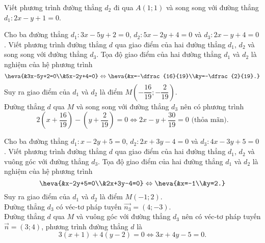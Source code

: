 	\begin{bt}%
		Viết phương trình đường thẳng $d_2$ đi qua $A\left(1;1\right)$ và song song với đường thẳng $d_1\colon 2x-y+1=0$.
	\end{bt}
	\begin{bt}%
		Cho ba đường thẳng $d_1\colon 3x-5y+2=0$, $d_2\colon 5x-2y+4=0$ và $d_3\colon 2x-y+4=0$. Viết phương trình đường thẳng $d$ qua giao điểm của hai đường thẳng $d_1$, $d_2$ và song song với đường thẳng $d_3$.
		\loigiai
		{Tọa độ giao điểm của hai đường thẳng $d_1$ và $d_2$ là nghiệm của hệ phương trình 
			$$\heva{&3x-5y+2=0\\&5x-2y+4=0} \Leftrightarrow \heva{&x=-\dfrac{16}{19}\\&y=-\dfrac{2}{19}.}$$
			Suy ra giao điểm của $d_1$ và $d_2$ là điểm $M\left(-\dfrac{16}{19};-\dfrac{2}{19}\right)$.\\
			Đường thẳng $d$ qua $M$ và song song với đường thẳng $d_3$ nên có phương trình
			$$2\left(x+\dfrac{16}{19}\right)-\left(y+\dfrac{2}{19}\right)=0 \Leftrightarrow 2x-y+\dfrac{30}{19}=0 \text{ (thỏa mãn)}.$$}
	\end{bt}
	\begin{bt}%
		Cho ba đường thẳng $d_1\colon x-2y+5=0$, $d_2\colon 2x+3y-4=0$ và $d_3\colon 4x-3y+5=0$. Viết phương trình đường thẳng $d$ qua giao điểm của hai đường thẳng $d_1$, $d_2$ và vuông góc với đường thẳng $d_3$.
		\loigiai
		{Tọa độ giao điểm của hai đường thẳng $d_1$ và $d_2$ là nghiệm của hệ phương trình 
			$$\heva{&x-2y+5=0\\&2x+3y-4=0} \Leftrightarrow \heva{&x=-1\\&y=2.}$$
			Suy ra giao điểm của $d_1$ và $d_2$ là điểm $M\left(-1;2\right)$.\\
			Đường thẳng $d_3$ có véc-tơ pháp tuyến $\overrightarrow{n_3}=(4;-3)$.\\
			Đường thẳng $d$ qua $M$ và vuông góc với đường thẳng $d_3$ nên có véc-tơ pháp tuyến $\overrightarrow{n}=(3;4)$, phương trình đường thẳng $d$ là
			$$3\left(x+1\right)+4\left(y-2\right)=0 \Leftrightarrow 3x+4y-5=0.$$}
	\end{bt}
	

